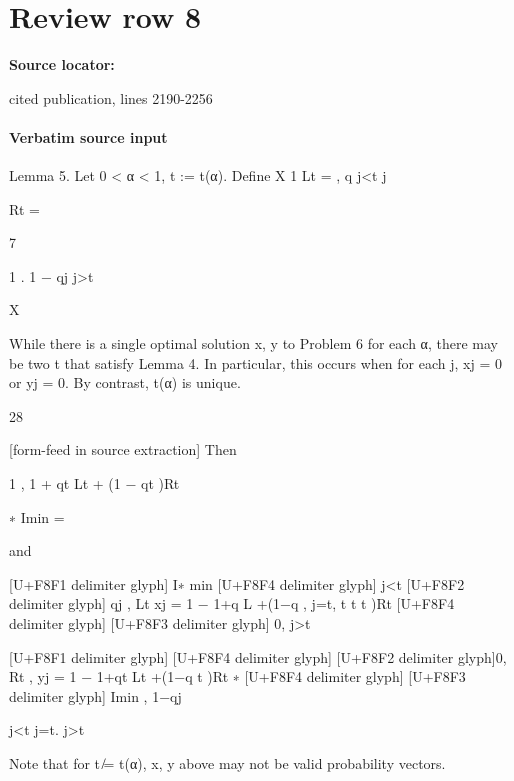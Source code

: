 \documentclass[10pt]{article}
\begin{document}
\section*{Review row 8}
\textbf{Source locator:} {\footnotesize\raggedright cited publication, lines 2190-\allowbreak{}2256\par}
\paragraph{Verbatim source input}
\begin{ReviewVerbatim}
Lemma 5. Let 0 < α < 1, t := t(α). Define
X 1
Lt =
,
q
j<t j

Rt =

7

1
.
1 − qj
j>t

X

While there is a single optimal solution x, y to Problem 6 for each α, there may be two t that satisfy Lemma
4. In particular, this occurs when for each j, xj = 0 or yj = 0. By contrast, t(α) is unique.

28


[form-feed in source extraction]
Then

1
,
1 + qt Lt + (1 − qt )Rt

∗
Imin
=

and

[U+F8F1 delimiter glyph] I∗
min
[U+F8F4 delimiter glyph]
j<t
[U+F8F2 delimiter glyph] qj ,
Lt
xj = 1 − 1+q L +(1−q
, j=t,
t t
t )Rt
[U+F8F4 delimiter glyph]
[U+F8F3 delimiter glyph]
0,
j>t

[U+F8F1 delimiter glyph]
[U+F8F4 delimiter glyph]
[U+F8F2 delimiter glyph]0,
Rt
,
yj = 1 − 1+qt Lt +(1−q
t )Rt
∗
[U+F8F4 delimiter glyph]
[U+F8F3 delimiter glyph] Imin ,
1−qj

j<t
j=t.
j>t

Note that for t ̸= t(α), x, y above may not be valid probability vectors.
\end{ReviewVerbatim}
\end{document}
